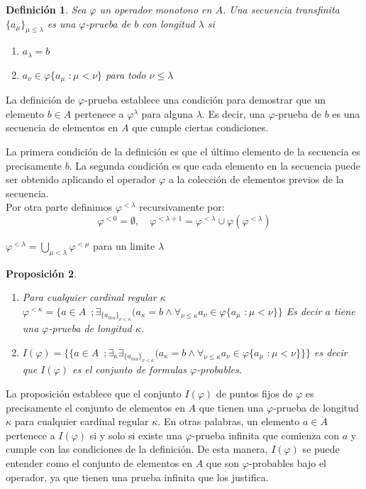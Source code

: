 \documentclass[executivepaper]{article}
\newtheorem{propo}{Proposición}[section]
\newtheorem{defi}[propo]{Definición}
\begin{document}
\begin{defi}
    Sea $\varphi$ un operador monotono en $A$. Una secuencia transfinita $\{a_{\mu}\}_{\mu\leq\lambda}$ es una $\varphi$-prueba de $b$ con longitud $\lambda$ si 
    \begin{enumerate}
        \item $a_{\lambda} =b$
        \item $a_{\nu}\in\varphi\{a_{\mu}\,\,:\mu<\nu\}$ para todo $\nu\leq\lambda$
    \end{enumerate}
\end{defi}
La definición de $\varphi$-prueba establece una condición para demostrar que un elemento $b\in A$ pertenece a $\varphi^\lambda$ para alguna $\lambda$. Es decir, una $\varphi$-prueba de $b$ es una secuencia de elementos en $A$ que cumple ciertas condiciones.

La primera condición de la definición es que el último elemento de la secuencia es precisamente $b$. La segunda condición es que cada elemento en la secuencia puede ser obtenido aplicando el operador $\varphi$ a la colección de elementos previos de la secuencia.\\

Por otra parte definimos $\varphi^{<\lambda}$ recursivamente por:
$$\varphi^{<0} = \emptyset, \,\,\,\,\,\, \varphi^{<\lambda + 1} = \varphi^{<\lambda} \cup \varphi(\varphi^{<\lambda})$$
\begin{center}
    $\varphi^{<\lambda} = \bigcup_{\mu<\lambda} \varphi^{<\mu}$ para un limite $\lambda$
\end{center}

\begin{propo}
    \begin{enumerate}
        \item Para cualquier cardinal regular $\kappa$\\
        $\varphi^{<\kappa}=\{a\in A \,\,\,; \exists_{\{a_{mu}\}_{\nu<\kappa}}(a_{\kappa} =b \land \forall_{\nu\leq\kappa}a_{\nu}\in\varphi\{a_{\mu}\,\,:\mu<\nu\}\}$ Es decir $a$ tiene una $\varphi$-prueba de longitud $\kappa$.
        \item $I(\varphi)=\{\{a\in A \,\,\,; \exists_{\kappa}\exists_{\{a_{mu}\}_{\nu<\kappa}}(a_{\kappa} = b \land \forall_{\nu\leq\kappa}a_{\nu}\in\varphi\{a_{\mu}\,\,:\mu<\nu\}\}\}$ es decir que $I(\varphi)$ es el conjunto de formulas $\varphi$-probables.
    \end{enumerate}
\end{propo}
La proposición establece que el conjunto $I(\varphi)$ de puntos fijos de $\varphi$ es precisamente el conjunto de elementos en $A$ que tienen una $\varphi$-prueba de longitud $\kappa$ para cualquier cardinal regular $\kappa$. En otras palabras, un elemento $a\in A$ pertenece a $I(\varphi)$ si y solo si existe una $\varphi$-prueba infinita que comienza con $a$ y cumple con las condiciones de la definición. De esta manera, $I(\varphi)$ se puede entender como el conjunto de elementos en $A$ que son $\varphi$-probables bajo el operador, ya que tienen una prueba infinita que los justifica.
\end{document}
